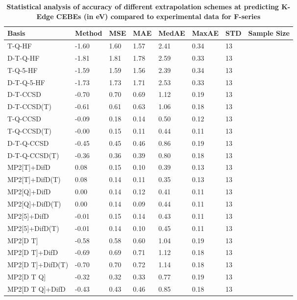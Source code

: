 \begin{table}
  \caption{\textbf{Statistical analysis of accuracy of different extrapolation schemes at predicting K-Edge CEBEs (in eV) compared to experimental data for F-series}}
  \label{tbl:extrap-scheme-summary-f}
  \begin{tabular}{l l l l l l l l }
    \toprule
    \textbf{Basis} & \textbf{Method} & \textbf{MSE} & \textbf{MAE} & \textbf{MedAE} & \textbf{MaxAE} & \textbf{STD} & \textbf{Sample Size} \\ 
    \midrule
    T-Q-HF & -1.60 & 1.60 & 1.57 & 2.41 & 0.34 & 13 \\ 
    D-T-Q-HF & -1.81 & 1.81 & 1.78 & 2.59 & 0.33 & 13 \\ 
    T-Q-5-HF & -1.59 & 1.59 & 1.56 & 2.39 & 0.34 & 13 \\ 
    D-T-Q-5-HF & -1.73 & 1.73 & 1.71 & 2.53 & 0.33 & 13 \\ 
    D-T-CCSD & -0.70 & 0.70 & 0.69 & 1.12 & 0.19 & 13 \\ 
    D-T-CCSD(T) & -0.61 & 0.61 & 0.63 & 1.06 & 0.18 & 13 \\ 
    T-Q-CCSD & -0.09 & 0.18 & 0.14 & 0.50 & 0.12 & 13 \\ 
    T-Q-CCSD(T) & -0.00 & 0.15 & 0.11 & 0.44 & 0.11 & 13 \\ 
    D-T-Q-CCSD & -0.45 & 0.45 & 0.46 & 0.86 & 0.19 & 13 \\ 
    D-T-Q-CCSD(T) & -0.36 & 0.36 & 0.39 & 0.80 & 0.18 & 13 \\ 
    MP2[T]+DifD & 0.08 & 0.15 & 0.10 & 0.39 & 0.13 & 13 \\ 
    MP2[T]+DifD(T) & 0.08 & 0.14 & 0.11 & 0.35 & 0.13 & 13 \\ 
    MP2[Q]+DifD & 0.00 & 0.14 & 0.12 & 0.41 & 0.11 & 13 \\ 
    MP2[Q]+DifD(T) & 0.00 & 0.14 & 0.09 & 0.44 & 0.11 & 13 \\ 
    MP2[5]+DifD & -0.01 & 0.15 & 0.14 & 0.43 & 0.11 & 13 \\ 
    MP2[5]+DifD(T) & -0.01 & 0.14 & 0.10 & 0.45 & 0.11 & 13 \\ 
    MP2[D T] & -0.58 & 0.58 & 0.60 & 1.04 & 0.19 & 13 \\ 
    MP2[D T]+DifD & -0.69 & 0.69 & 0.71 & 1.12 & 0.18 & 13 \\ 
    MP2[D T]+DifD(T) & -0.70 & 0.70 & 0.72 & 1.14 & 0.18 & 13 \\ 
    MP2[D T Q] & -0.32 & 0.32 & 0.33 & 0.77 & 0.19 & 13 \\ 
    MP2[D T Q]+DifD & -0.43 & 0.43 & 0.46 & 0.85 & 0.18 & 13 \\ 

\end{tabular}
\end{table}
